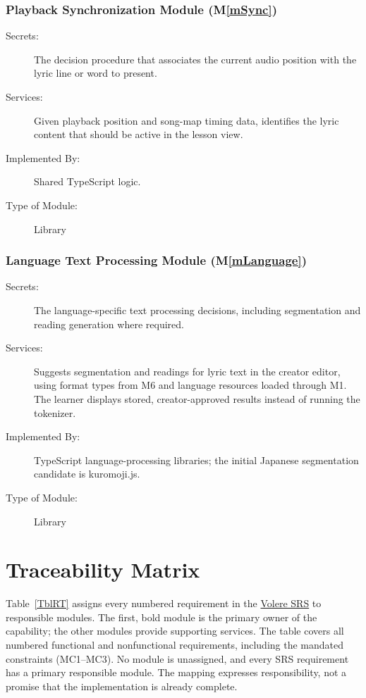 \documentclass[12pt, titlepage]{article}
\newcommand{\mref}[1]{M\ref{#1}}
\begin{document}
\subsubsection{Playback Synchronization Module (\mref{mSync})}

\begin{description}
\item[Secrets:] The decision procedure that associates the current audio
  position with the lyric line or word to present.
\item[Services:] Given playback position and song-map timing data, identifies
  the lyric content that should be active in the lesson view.
\item[Implemented By:] Shared TypeScript logic.
\item[Type of Module:] Library
\end{description}

\subsubsection{Language Text Processing Module (\mref{mLanguage})}

\begin{description}
\item[Secrets:] The language-specific text processing decisions, including
  segmentation and reading generation where required.
\item[Services:] Suggests segmentation and readings for lyric text
  in the creator editor, using format types from M6 and language
  resources loaded through M1. The learner displays stored,
  creator-approved results instead of running the tokenizer.
\item[Implemented By:] TypeScript language-processing libraries; the initial
  Japanese segmentation candidate is kuromoji.js.
\item[Type of Module:] Library
\end{description}

\section{Traceability Matrix} \label{SecTM}

Table~\ref{TblRT} assigns every numbered requirement in the
\href{https://github.com/rhea333/LingoLyrics/blob/main/docs/SRS-Volere/SRS.tex}
{Volere SRS} to responsible modules. The first, bold module is the
primary owner of the capability; the other modules provide supporting
services. The table covers all numbered functional and nonfunctional
requirements, including the mandated constraints (MC1--MC3).
No module is unassigned, and every SRS requirement has a primary
responsible module. The mapping expresses responsibility, not a promise
that the implementation is already complete.
\end{document}
